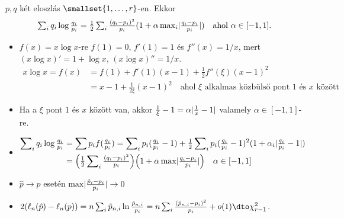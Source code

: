 \documentclass[aspectratio=169,notheorems,9pt,\option]{beamer}
\begin{document}
\begin{frame}
  \begin{proposition}
    $p,q$ két eloszlás $\smallset{1,\dots,r}$-en. Ekkor
    \begin{displaymath}
      \textstyle \sum_i q_i\log\frac {q_i}{p_i}=\tfrac12\sum_i\frac
      {(q_i-p_i)^2}{p_i}(1+\alpha\max_{i}\lvert\frac{q_i-p_i}{p_i}\rvert)\quad\text{ahol $\alpha\in[-1,1]$.}
    \end{displaymath}
  \end{proposition}
  \begin{itemize}
    \item $f (x)=x\log x$-re $f (1)=0$, $f' (1)=1$ és $f''
    (x)=1/x$, mert $(x\log x)'=1+\log x$, $(x\log x)''=1/x$.
    \begin{align*}
      x\log x = f (x)&=f (1)+f' (1) (x-1)
      +\tfrac12 f'' (\xi) (x-1)^2\\
      &= x-1+\tfrac1{2\xi} (x-1)^2
      \quad\text{ahol $\xi$ alkalmas
      közbülső pont $1$ és $x$ között}%
    \end{align*}
    \item Ha a $\xi$ pont  $1$ és $x$ között van, akkor
    $\frac1\xi-1=\alpha\lvert\frac1x-1\rvert$ valamely $\alpha\in[-1,1]$-re.
    
    \item
    \begin{align*}
      \sum\nolimits_i q_i\log\tfrac{q_i}{p_i}
      &=\sum p_if(\tfrac{q_i}{p_i})=
      \sum\nolimits_i p_i(\tfrac{q_i}{p_i}-1)+
      \tfrac12\sum\nolimits_ip_i(\tfrac{q_i}{p_i}-1)^2\zjel{1+\alpha_i\abs{\tfrac{q_i}{p_i}-1}}\\
      &=
      \zjel*{\tfrac12\sum\nolimits_i \tfrac{(q_i-p_i)^2}{p_i}}
      \zjel*{1+\alpha\max\abs{\tfrac{q_i-p_i}{p_i}}}\quad\alpha\in[-1,1]
    \end{align*}
    \item $\hat p\to p$ esetén   $\max\lvert\tfrac{\hat p_i-p_i}{p_i}\rvert\to0$
    \item $2\zjel{\ell_n(\hat p)-\ell_n(p)}
    =n\sum_i \hat p_{n,i}\ln\frac{\hat p_{n,i}}{p_i}
    =n\sum_i\frac{(\hat p_{n,i}-p_i)^2}{p_i}+o(1)\dto\chi^2_{r-1}$.
  \end{itemize}
  
\end{frame}
\end{document}
